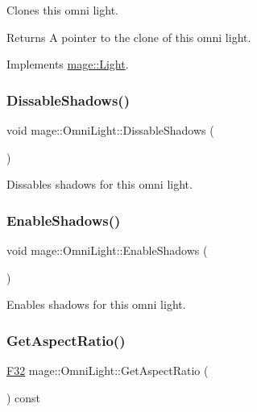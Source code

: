 Clones this omni light.

\begin{DoxyReturn}{Returns}
A pointer to the clone of this omni light. 
\end{DoxyReturn}


Implements \hyperlink{classmage_1_1_light_aa613d76a1ebda69efde853d15f75490c}{mage\+::\+Light}.

\hypertarget{classmage_1_1_omni_light_a2353a53e336ffb55be9949ea6f1d8979}{}\label{classmage_1_1_omni_light_a2353a53e336ffb55be9949ea6f1d8979} 
\subsubsection{\texorpdfstring{Dissable\+Shadows()}{DissableShadows()}}
{\footnotesize\ttfamily void mage\+::\+Omni\+Light\+::\+Dissable\+Shadows (\begin{DoxyParamCaption}{ }\end{DoxyParamCaption})\hspace{0.3cm}{\ttfamily [noexcept]}}

Dissables shadows for this omni light. \hypertarget{classmage_1_1_omni_light_ad7c2e780dc83eb63fa44e1475492e192}{}\label{classmage_1_1_omni_light_ad7c2e780dc83eb63fa44e1475492e192} 
\subsubsection{\texorpdfstring{Enable\+Shadows()}{EnableShadows()}}
{\footnotesize\ttfamily void mage\+::\+Omni\+Light\+::\+Enable\+Shadows (\begin{DoxyParamCaption}{ }\end{DoxyParamCaption})\hspace{0.3cm}{\ttfamily [noexcept]}}

Enables shadows for this omni light. \hypertarget{classmage_1_1_omni_light_a976a37c3f7c160f0383a93e4f7497eed}{}\label{classmage_1_1_omni_light_a976a37c3f7c160f0383a93e4f7497eed} 
\subsubsection{\texorpdfstring{Get\+Aspect\+Ratio()}{GetAspectRatio()}}
{\footnotesize\ttfamily \hyperlink{namespacemage_aa97e833b45f06d60a0a9c4fc22ae02c0}{F32} mage\+::\+Omni\+Light\+::\+Get\+Aspect\+Ratio (\begin{DoxyParamCaption}{ }\end{DoxyParamCaption}) const\hspace{0.3cm}{\ttfamily [noexcept]}}

